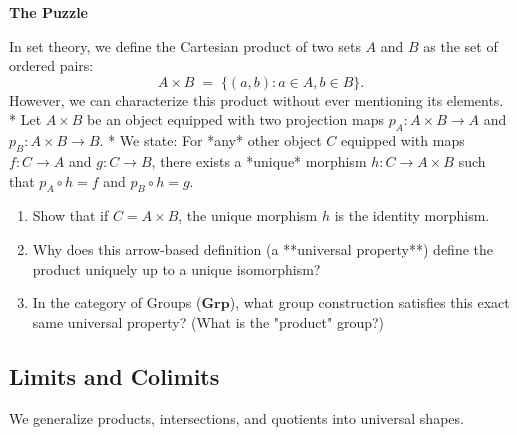 \documentclass[12pt, a4paper]{article}
\newenvironment{puzzlebox}
  {\par\medskip\fillcolorbox{LightGold}{PuzzleColor}{The Puzzle}}
  {\par\medskip}
\newcommand{\fillcolorbox}[3]{%
  \noindent
  \filldrawbox{#1}{#2}{\textbf{\sffamily\color{white}#3}}\par\nobreak\vspace{4pt}
}
\newcommand{\filldrawbox}[3]{%
  \colorbox{#1}{\parbox{\dimexpr\linewidth-2\fboxsep\relax}{%
    \vspace{4pt}\noindent\hspace{4pt}#3\vspace{4pt}%
  }}%
}
\begin{document}
\begin{puzzlebox}
In set theory, we define the Cartesian product of two sets $A$ and $B$ as the set of ordered pairs:
\[
  A \times B \;=\; \{(a, b) : a \in A, b \in B\}.
\]
However, we can characterize this product without ever mentioning its elements.
* Let $A \times B$ be an object equipped with two projection maps $p_A: A \times B \to A$ and $p_B: A \times B \to B$.
* We state: For *any* other object $C$ equipped with maps $f: C \to A$ and $g: C \to B$, there exists a *unique* morphism $h: C \to A \times B$ such that $p_A \circ h = f$ and $p_B \circ h = g$.
\begin{center}
\end{center}
\begin{enumerate}[label=(\alph*), leftmargin=*]
  \item Show that if $C = A \times B$, the unique morphism $h$ is the identity morphism.
  \item Why does this arrow-based definition (a **universal property**) define the product uniquely up to a unique isomorphism?
  \item In the category of Groups ($\mathbf{Grp}$), what group construction satisfies this exact same universal property? (What is the "product" group?)
\end{enumerate}
\end{puzzlebox}

\subsection{Limits and Colimits}

We generalize products, intersections, and quotients into universal shapes.
\end{document}
